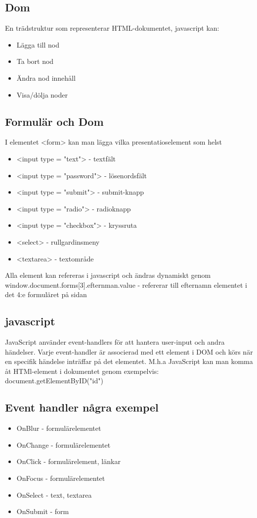 \documentclass[12pt,a4paper]{article}
\begin{document}
\subsection{Dom}
En trädstruktur som representerar HTML-dokumentet, javascript kan:
\begin{itemize}
    \item Lägga till nod
    \item Ta bort nod
    \item Ändra nod innehåll
    \item Visa/dölja noder
\end{itemize}

\subsection{Formulär och Dom}
I elementet <form> kan man lägga vilka presentatioselement som helst
\begin{itemize}
    \item <input type = "text"> - textfält
    \item <input type = "password"> - lösenordsfält
    \item <input type = "submit"> - submit-knapp
    \item <input type = "radio"> - radioknapp
    \item <input type = "checkbox"> - kryssruta
    \item <select> - rullgardinsmeny
    \item <textarea> - textområde
\end{itemize}
Alla element kan refereras i javascript och ändras dynamiskt genom 
\newline
\noindent window.document.forms[3].efternman.value - refererar till efternamn elementet i det 4:e formuläret på sidan

\subsection{javascript}
JavaScript använder event-handlers för att hantera user-input och andra händelser. Varje event-handler är associerad med ett element i DOM och körs när en specifik händelse inträffar på det elementet. M.h.a JavaScript kan man komma åt HTMl-element i dokumentet genom exempelvis: document.getElementByID("id")

\newpage

\subsection{Event handler några exempel}
\begin{itemize}
    \item OnBlur - formulärelementet
    \item OnChange - formulärelementet
    \item OnClick - formulärelement, länkar
    \item OnFocus - formulärelementet
    \item OnSelect - text, textarea
    \item OnSubmit - form
\end{itemize}
\end{document}
